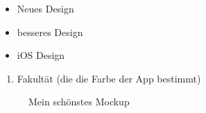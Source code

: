 \begin{itemize}
\item Neues Design
\item besseres Design
\item iOS Design
\end{itemize}

\begin{enumerate}
\item Fakultät (die die Farbe der App bestimmt)
\end{enumerate}

\begin{figure}[H]
	\centering
	\caption{Mein schönstes Mockup}
	\label{fig2}
\end{figure}

